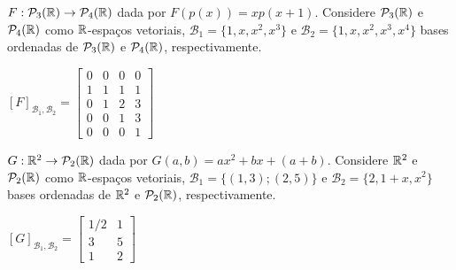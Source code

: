 \documentclass[12pt]{exam}
\begin{document}
\begin{exercicio}
    $F : \mathcal{P}_3(\mathbb{R}) \to \mathcal{P}_4(\mathbb{R})$ dada por $F(p(x)) = xp(x + 1)$. Considere $\mathcal{P}_3(\mathbb{R})$ e $\mathcal{P}_4(\mathbb{R})$ como $\mathbb{R}$-espaços vetoriais, $\mathcal{B}_1 = \{1, x, x^2, x^3\}$ e $\mathcal{B}_2 = \{1, x, x^2, x^3, x^4\}$ bases ordenadas de $\mathcal{P}_3(\mathbb{R})$ e $\mathcal{P}_4(\mathbb{R})$, respectivamente.

    \begin{solucao}
        $[F]_{\mathcal{B}_1, \mathcal{B}_2} = \begin{bmatrix}
            0 & 0 & 0 & 0\\
            1 & 1 & 1 & 1\\
            0 & 1 & 2 & 3\\
            0 & 0 & 1 & 3\\
            0 & 0 & 0 & 1
        \end{bmatrix}$
    \end{solucao}
\end{exercicio}

\begin{exercicio}
    $G : \mathbb{R}^2 \to \mathcal{P}_2(\mathbb{R})$ dada por $G(a,b) = ax^2 + bx + (a + b)$. Considere $\mathbb{R}^2$ e $\mathcal{P}_2(\mathbb{R})$ como $\mathbb{R}$-espaços vetoriais, $\mathcal{B}_1 = \{(1,3); (2,5)\}$ e $\mathcal{B}_2 = \{2, 1 + x, x^2\}$ bases ordenadas de $\mathbb{R}^2$ e $\mathcal{P}_2(\mathbb{R})$, respectivamente.

    \begin{solucao}
        $[G]_{\mathcal{B}_1, \mathcal{B}_2} = \begin{bmatrix}
            1/2 & 1\\
            3 & 5\\
            1 & 2
        \end{bmatrix}$
    \end{solucao}
\end{exercicio}
\end{document}
